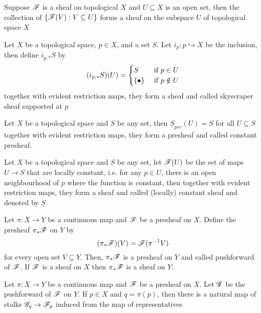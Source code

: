 \begin{definition}
	Suppose $\mathscr{F}$ is a sheaf on topological $X$ and $U \subseteq X$ is an open set, then the collection of $\{\mathscr{F}(V): V \subseteq U\}$ forms a sheaf on the subspace $U$ of topological space $X$
\end{definition}

\begin{remark}
	Let $X$ be a topological space, $p \in X$, and a set $S$. Let $i_p: p \hookrightarrow X$ be the inclusion, then define $i_{p, *} S$ by
	$$
		(i_{p, *} S)(U) = \begin{cases}
			S &\text{ if } p \in U \\
			\{\bullet\} &\text{ if } p \notin U \\
		\end{cases}
	$$
	together with evident restriction maps, they form a sheaf and called skyscraper sheaf supported at $p$
\end{remark}

\begin{remark}
	Let $X$ be a topological space and $S$ be any set, then $\underline{S}_{pre}(U) = S$ for all $U \subseteq S$ together with evident restriction maps, they form a presheaf and called constant presheaf.
	
	Let $X$ be a topological space and $S$ be any set, let $\mathscr{F}(U)$ be the set of maps $U \to S$ that are locally constant, i.e. for any $p \in U$, there is an open neighbourhood of $p$ where the function is constant, then together with evident restriction maps, they form a sheaf and called (locally) constant sheaf and denoted by $\underline{S}$
\end{remark}

\begin{definition}
	Let $\pi: X \to Y$ be a continuous map and $\mathscr{F}$ be a presheaf on $X$. Define the presheaf $\pi_* \mathscr{F}$ on $Y$ by
	$$
		(\pi_* \mathscr{F})(V) = \mathscr{F}(\pi^{-1} V)
	$$
	for every open set $V \subseteq Y$. Then, $\pi_* \mathscr{F}$ is a presheaf on $Y$ and called pushforward of $\mathscr{F}$. If $\mathscr{F}$ is a sheaf on $X$ then $\pi_* \mathscr{F}$ is a sheaf on $Y$.
\end{definition}

\begin{proposition}
	Let $\pi: X \to Y$ be a continuous map and $\mathscr{F}$ be a presheaf on $X$. Let $\mathscr{G}$ be the pushforward of $\mathscr{F}$ on $Y$. If $p \in X$ and $q = \pi(p)$, then there is a natural map of stalks $\mathscr{G}_q \to \mathscr{F}_p$ induced from the map of representatives
\end{proposition}

